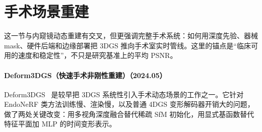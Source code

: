 \section{手术场景重建}

这一节与内窥镜动态重建有交叉，但更强调完整手术系统：如何用深度先验、器械 mask、硬件后端和边缘部署把 3DGS 推向手术室实时管线。这里的锚点是“临床可用的速度和稳定性”，不只是研究基准上的平均 PSNR。


\paragraph{Deform3DGS（快速手术非刚性重建）（2024.05）}
Deform3DGS~\cite{2405_17835} 是较早把 3DGS 系统性引入手术动态场景的工作之一。它针对 EndoNeRF 类方法训练慢、渲染慢，以及普通 4DGS 变形解码器开销大的问题，做了两处关键改变：用多视角深度融合替代稀疏 SfM 初始化，用显式基函数替代特征平面加 MLP 的时间变形表示。

